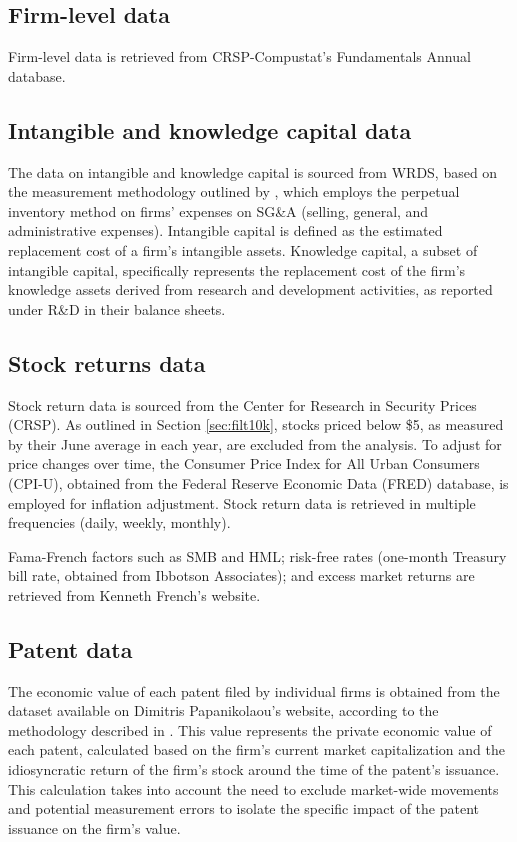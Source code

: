\documentclass[12pt, letterpaper]{article}
\begin{document}
\subsection{Firm-level data}

Firm-level data is retrieved from CRSP-Compustat's Fundamentals Annual database.

\subsection{Intangible and knowledge capital data}

The data on intangible and knowledge capital is sourced from WRDS, based on the measurement methodology outlined by \cite{Peters2017-fl}, which employs the perpetual inventory method on firms' expenses on SG\&A (selling, general, and administrative expenses). Intangible capital is defined as the estimated replacement cost of a firm's intangible assets. Knowledge capital, a subset of intangible capital, specifically represents the replacement cost of the firm's knowledge assets derived from research and development activities, as reported under R\&D in their balance sheets.

\subsection{Stock returns data}

Stock return data is sourced from the Center for Research in Security Prices (CRSP). As outlined in Section \ref{sec:filt10k}, stocks priced below \$5, as measured by their June average in each year, are excluded from the analysis. To adjust for price changes over time, the Consumer Price Index for All Urban Consumers (CPI-U), obtained from the Federal Reserve Economic Data (FRED) database, is employed for inflation adjustment. Stock return data is retrieved in multiple frequencies (daily, weekly, monthly). 

Fama-French factors such as SMB and HML; risk-free rates (one-month Treasury bill rate, obtained from Ibbotson Associates); and excess market returns are retrieved from Kenneth French's website.


\subsection{Patent data}

The economic value of each patent filed by individual firms is obtained from the dataset available on Dimitris Papanikolaou's website, according to the methodology described in \cite{Kogan2017-fx}. This value represents the private economic value of each patent, calculated based on the firm's current market capitalization and the idiosyncratic return of the firm's stock around the time of the patent's issuance. This calculation takes into account the need to exclude market-wide movements and potential measurement errors to isolate the specific impact of the patent issuance on the firm's value.
\end{document}
